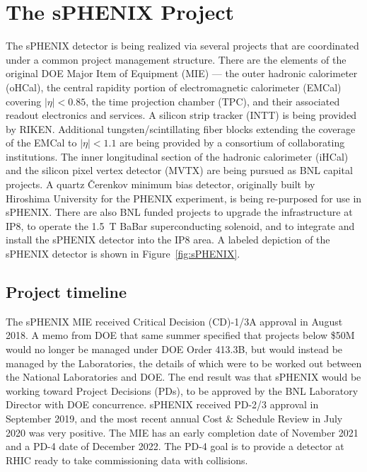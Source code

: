 \chapter{The sPHENIX Project}
\label{chap:project}

The sPHENIX detector is being realized via several projects that are
coordinated under a common project management structure.  There are
the elements of the original DOE Major Item of Equipment (MIE) --- the outer hadronic calorimeter (oHCal), the
central rapidity portion of electromagnetic calorimeter (EMCal)
covering $|\eta| < 0.85$, the time projection chamber (TPC), and their
associated readout electronics and services.  A silicon strip tracker
(INTT) is being provided by RIKEN.  Additional tungsten/scintillating
fiber blocks extending the coverage of the EMCal to $|\eta| < 1.1$ are
being provided by a consortium of collaborating institutions.
The inner longitudinal section of the hadronic calorimeter (iHCal) and
the silicon pixel vertex detector (MVTX) are being pursued as BNL
capital projects.  A quartz \v{C}erenkov minimum bias detector,
originally built by Hiroshima University for the PHENIX experiment, is
being re-purposed for use in sPHENIX.  There are also BNL funded
projects to upgrade the infrastructure at IP8, to operate the 1.5~T BaBar
superconducting solenoid, and to integrate and
install the sPHENIX detector into the IP8 area.  A labeled depiction of the
sPHENIX detector is shown in Figure~\ref{fig:sPHENIX}.

\section{Project timeline}
\label{sec:timeline}

The sPHENIX MIE received Critical Decision (CD)-1/3A approval in August 2018.  A memo from
DOE that same summer specified that projects below \$50M would no
longer be managed under DOE Order 413.3B, but would instead be managed
by the Laboratories, the details of which were to be worked out
between the National Laboratories and DOE.  The end result was that
sPHENIX would be working toward Project Decisions (PDs), to be
approved by the BNL Laboratory Director with DOE concurrence.  sPHENIX
received PD-2/3 approval in September 2019, and the most recent annual Cost \& Schedule Review in July 2020 was very positive.  The MIE has an early
completion date of November 2021 and a PD-4 date of December 2022.
The PD-4 goal is to provide a detector at RHIC ready to take 
commissioning data with collisions.


